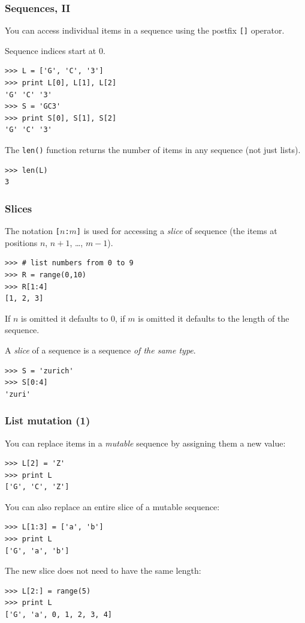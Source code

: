 \documentclass[english,serif,mathserif,xcolor=pdftex,dvipsnames,table]{beamer}
\begin{document}
\begin{frame}
  \frametitle{Sequences, II}
  You can access individual items in a sequence using the postfix
  \texttt{[]} operator.

  \+
  Sequence indices start at 0.
  \pause
\begin{lstlisting}
>>> L = ['G', 'C', '3']
>>> print L[0], L[1], L[2]
'G' 'C' '3'
>>> S = 'GC3'
>>> print S[0], S[1], S[2]
'G' 'C' '3'
\end{lstlisting}

  \+\pause
  The \texttt{len()} function returns the number of items in any
  sequence (not just lists).
\begin{lstlisting}
>>> len(L)
3
\end{lstlisting}
\end{frame}


\begin{frame}[fragile]
  \frametitle{Slices}
  The notation \texttt{[$n$:$m$]} is used for accessing a \emph{slice}
  of sequence (the items at positions $n$, $n+1$, \ldots, $m-1$).
\pause
\begin{lstlisting}
>>> # list numbers from 0 to 9
>>> R = range(0,10)
>>> R[1:4]
[1, 2, 3]
\end{lstlisting}

  \+
  If $n$ is omitted it defaults to 0, if $m$ is omitted it defaults to
  the length of the sequence.

  \+\pause A \textit{slice} of a sequence is a sequence \textit{of the same
  type}.
\begin{lstlisting}
>>> S = 'zurich'
>>> S[0:4]
'zuri'
\end{lstlisting}
\end{frame}


\begin{frame}[fragile]
  \frametitle{List mutation (1)}
  You can replace items in a \emph{mutable} sequence by assigning them
  a new value:
\begin{lstlisting}
>>> L[2] = 'Z'
>>> print L
['G', 'C', 'Z']
\end{lstlisting}

\pause
You can also replace an entire slice of a mutable sequence:
\begin{lstlisting}
>>> L[1:3] = ['a', 'b']
>>> print L
['G', 'a', 'b']
\end{lstlisting}

\pause
The new slice does not need to have the same length:
\begin{lstlisting}
>>> L[2:] = range(5)
>>> print L
['G', 'a', 0, 1, 2, 3, 4]
\end{lstlisting}
\end{frame}
\end{document}

